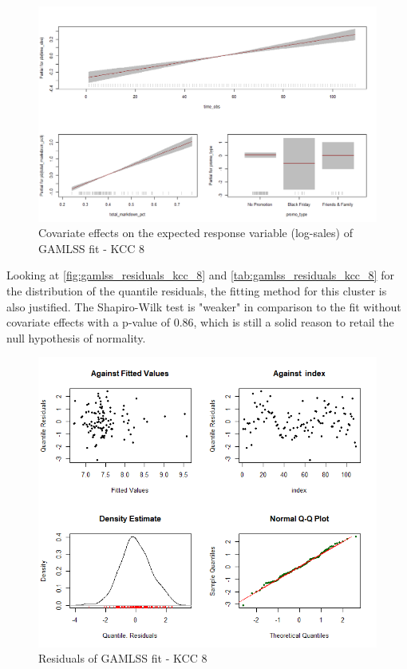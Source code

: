 \begin{figure}[H]
\centering
  \includegraphics[width=0.95\linewidth]{figures/gamlss_effects_kcc_8.png}
  \caption{Covariate effects on the expected response variable (log-sales) of GAMLSS fit - KCC 8}
  \label{fig:gamlss_effects_kcc_8}
\end{figure}



Looking at \autoref{fig:gamlss_residuals_kcc_8} and \autoref{tab:gamlss_residuals_kcc_8} for the distribution of the quantile residuals, the fitting method for this cluster is also justified. The Shapiro-Wilk test is "weaker" in comparison to the fit without covariate effects with a p-value of 0.86, which is still a solid reason to retail the null hypothesis of normality.


\begin{figure}[H]
\centering
  \includegraphics[width=0.95\linewidth]{figures/gamlss_residuals_kcc_8.png}
  \caption{Residuals of GAMLSS fit - KCC 8}
  \label{fig:gamlss_residuals_kcc_8}
\end{figure}


